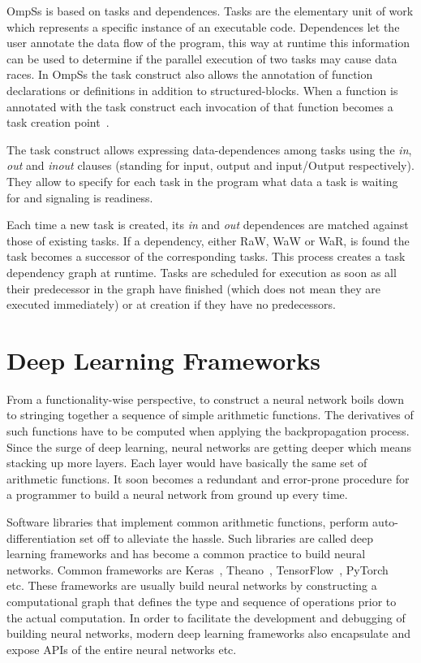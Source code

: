 OmpSs is based on tasks and dependences. Tasks are the elementary unit of work 
which represents a specific instance of an executable code. Dependences let the 
user annotate the data flow of the program, this way at runtime this information 
can be used to determine if the parallel execution of two tasks may cause data 
races.
In OmpSs the task construct also allows the annotation of function declarations 
or definitions in addition to structured-blocks. When a function is annotated 
with the task construct each invocation of that function becomes a task creation 
point~\cite{Bueno13}.

The task construct allows expressing data-dependences among tasks using the 
\textit{in}, \textit{out} and \textit{inout} clauses (standing for input, output 
and input/Output respectively). They allow to specify for each task in the 
program what data a task is waiting for and signaling is readiness.

Each time a new task is created, its \textit{in} and \textit{out} dependences 
are matched against those of existing tasks. If a dependency, either RaW, WaW or 
WaR, is found the task becomes a successor of the corresponding tasks. This 
process creates a task dependency graph at runtime. Tasks are scheduled for 
execution as soon as all their predecessor in the graph have finished (which 
does not mean they are executed immediately) or at creation if they have no 
predecessors.

\section{Deep Learning Frameworks}
From a functionality-wise perspective, to construct a neural network boils down 
to stringing together a sequence of simple arithmetic functions. The derivatives
of such functions have to be computed when applying the backpropagation process.
Since the surge of deep learning, neural networks are getting deeper which means 
stacking up more layers. Each layer would have basically the same set of 
arithmetic functions. It soon becomes a redundant and error-prone procedure for 
a programmer to build a neural network from ground up every time. 

Software libraries that implement common arithmetic functions, perform 
auto-differentiation set off to alleviate the hassle. Such libraries are called 
deep learning frameworks and has become a common practice to build neural 
networks. Common frameworks are Keras~\cite{keras}, Theano~\cite{theano}, 
TensorFlow~\cite{tensorflow}, PyTorch~\cite{pytorch} etc. These frameworks are 
usually build neural networks by constructing a computational graph that defines 
the type and sequence of operations prior to the actual computation.
In order to facilitate the development and debugging of building neural 
networks,
modern deep learning frameworks also encapsulate and expose APIs of the entire 
neural networks etc.

